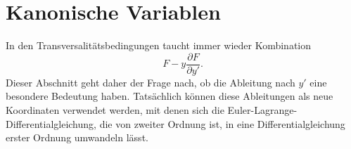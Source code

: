 %
%
%
\section{Kanonische Variablen
\label{buch:hamiltonjacobi:section:kanonisch}}
In den Transversalitätsbedingungen taucht immer wieder Kombination
\[
F - y\frac{\partial F}{\partial y'}.
\]
Dieser Abschnitt geht daher der Frage nach, ob die Ableitung nach
$y'$ eine besondere Bedeutung haben.
Tatsächlich können diese Ableitungen als neue Koordinaten verwendet
werden, mit denen sich die Euler-Lagrange-Differentialgleichung, die
von zweiter Ordnung ist, in eine Differentialgleichung erster Ordnung
umwandeln lässt.





